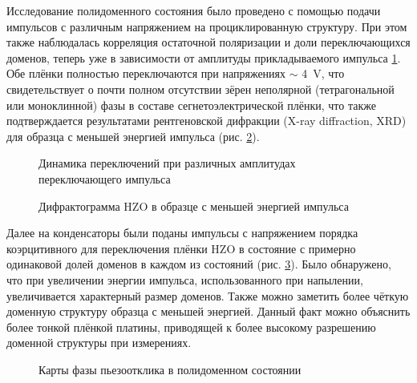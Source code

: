 Исследование полидоменного состояния было проведено с помощью подачи импульсов с различным напряжением на проциклированную структуру. При этом также наблюдалась корреляция остаточной поляризации и доли переключающихся доменов, теперь уже в зависимости от амплитуды прикладываемого импульса \cref{fig:pfm:polydomain:hyst}. Обе плёнки полностью переключаются при напряжениях \(\sim\) \SI{4}{\volt}, что свидетельствует о почти полном отсутствии зёрен неполярной (тетрагональной или моноклинной) фазы в составе сегнетоэлектрической плёнки, что также подтверждается результатами рентгеновской дифракции (X-ray diffraction, XRD) для образца с меньшей энергией импульса (рис. \cref{fig:xrd}).


\begin{figure}[ht]
    \caption[Этот текст попадает в названия рисунков в списке рисунков]{Динамика переключений при различных амплитудах переключающего импульса}\label{fig:pfm:polydomain:hyst}
\end{figure}

\begin{figure}[ht]
    \caption{Дифрактограмма HZO в образце с меньшей энергией импульса}\label{fig:xrd}
\end{figure}

Далее на конденсаторы были поданы импульсы с напряжением порядка коэрцитивного для переключения плёнки HZO в состояние с примерно одинаковой долей доменов в каждом из состояний (рис. \cref{fig:pfm:polydomain}). Было обнаружено, что при увеличении энергии импульса, использованного при напылении, увеличивается характерный размер доменов. Также можно заметить более чёткую доменную структуру образца с меньшей энергией. Данный факт можно объяснить более тонкой плёнкой платины, приводящей к более высокому разрешению доменной структуры при измерениях.

\begin{figure}[ht]
    \caption{Карты фазы пьезоотклика в полидоменном состоянии}\label{fig:pfm:polydomain}
\end{figure}



